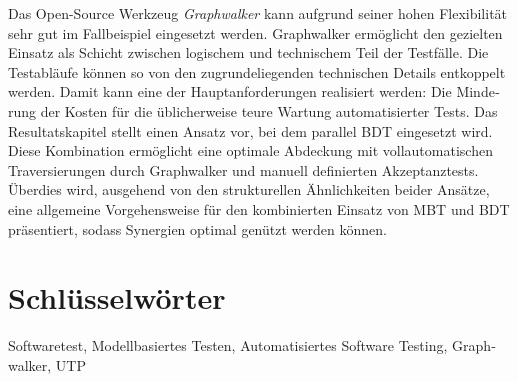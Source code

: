 \begin{otherlanguage}{ngerman}
Das Open-Source Werkzeug \textit{Graphwalker} kann aufgrund seiner hohen Flexibilität sehr gut im Fallbeispiel eingesetzt werden. Graphwalker ermöglicht den gezielten Einsatz als Schicht zwischen logischem und technischem Teil der Testfälle. Die Testabläufe können so von den zugrundeliegenden technischen Details entkoppelt werden. Damit kann eine der Hauptanforderungen realisiert werden: Die Minderung der Kosten für die üblicherweise teure Wartung automatisierter Tests. Das Resultatskapitel stellt einen Ansatz vor, bei dem parallel \Gls{BDT} eingesetzt wird. Diese Kombination ermöglicht eine optimale Abdeckung mit vollautomatischen Traversierungen durch Graphwalker und manuell definierten Akzeptanztests. Überdies wird, ausgehend von den strukturellen Ähnlichkeiten beider Ansätze, eine allgemeine Vorgehensweise für den kombinierten Einsatz von \Gls{MBT} und \Gls{BDT} präsentiert, sodass Synergien optimal genützt werden können.

\bigskip

  \section*{Schlüsselwörter}
  Softwaretest, Modellbasiertes Testen, Automatisiertes Software Testing, Graphwalker, UTP

\end{otherlanguage}

